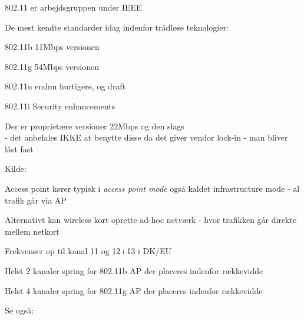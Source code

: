 
\begin{list1}
\item 802.11 er arbejdsgruppen under IEEE 
\item De mest kendte standarder idag indenfor trådløse teknologier:
\begin{list2}
\item 802.11b 11Mbps versionen
\item 802.11g 54Mbps versionen
\item 802.11n endnu hurtigere, og draft
\item 802.11i Security enhancements
\end{list2}
\item Der er proprietære versioner 22Mbps og den slags\\
- det anbefales IKKE at benytte disse da det giver vendor lock-in -
man bliver låst fast
\end{list1}

Kilde: 


\begin{list1}
\item Access point kører typisk i \emph{access point mode} også kaldet
  infrastructure mode - al trafik går via AP
\item Alternativt kan wireless kort oprette ad-hoc netværk - hvor
  trafikken går direkte mellem netkort
\item Frekvenser op til kanal 11 og 12+13 i DK/EU
\item Helst 2 kanaler spring for 802.11b AP der placeres indenfor rækkevidde
\item Helst 4 kanaler spring for 802.11g AP der placeres indenfor rækkevidde
\end{list1}








\begin{list1}
\item Se også:
\end{list1}


